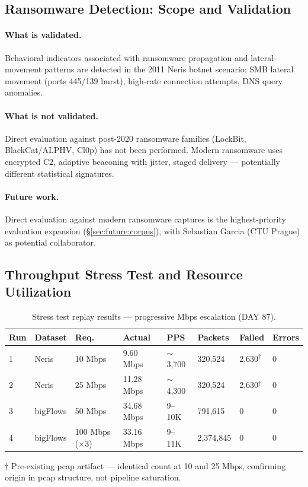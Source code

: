 \documentclass[11pt,a4paper]{article}
\begin{document}
    \subsection{Ransomware Detection: Scope and Validation}

    \paragraph{What is validated.}
    Behavioral indicators associated with ransomware propagation and lateral-movement patterns
    are detected in the 2011 Neris botnet scenario: SMB lateral movement (ports 445/139 burst),
    high-rate connection attempts, DNS query anomalies.

    \paragraph{What is not validated.}
    Direct evaluation against post-2020 ransomware families (LockBit, BlackCat/ALPHV, Cl0p) has
    not been performed. Modern ransomware uses encrypted C2, adaptive beaconing with jitter,
    staged delivery --- potentially different statistical signatures.

    \paragraph{Future work.}
    Direct evaluation against modern ransomware captures is the highest-priority evaluation
    expansion (\S\ref{sec:future:corpus}), with Sebastian Garcia (CTU Prague) as potential
    collaborator.

    \subsection{Throughput Stress Test and Resource Utilization}

    \begin{table}[h]
        \centering
        \caption{Stress test replay results --- progressive Mbps escalation (DAY 87).}
        \label{tab:stress}
        \begin{tabular}{llllllll}
            \toprule
            \textbf{Run} & \textbf{Dataset} & \textbf{Req.} & \textbf{Actual} & \textbf{PPS} & \textbf{Packets} & \textbf{Failed} & \textbf{Errors} \\
            \midrule
            1 & Neris    & 10 Mbps  & 9.60 Mbps  & ${\sim}$3,700   & 320,524   & 2,630$^{\dagger}$ & 0 \\
            2 & Neris    & 25 Mbps  & 11.28 Mbps & ${\sim}$4,300   & 320,524   & 2,630$^{\dagger}$ & 0 \\
            3 & bigFlows & 50 Mbps  & 34.68 Mbps & 9--10K          & 791,615   & 0                 & 0 \\
            4 & bigFlows & 100 Mbps ($\times$3) & 33.16 Mbps & 9--11K & 2,374,845 & 0           & 0 \\
            \bottomrule
        \end{tabular}
        \medskip
        \footnotesize{$\dagger$ Pre-existing pcap artifact --- identical count at 10 and 25 Mbps,
            confirming origin in pcap structure, not pipeline saturation.}
    \end{table}
\end{document}
